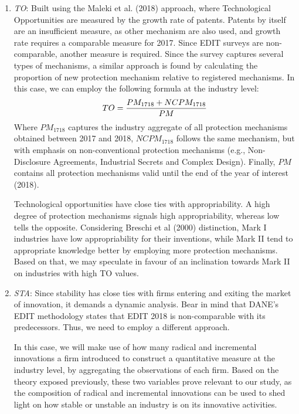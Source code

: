 \documentclass[12pt,a4paper]{article}
\begin{document}
\begin{enumerate}
	\item \textit{TO}: Built using the Maleki et al. (2018) approach, where Technological Opportunities are measured by the growth rate of patents. Patents by itself are an insufficient measure, as other mechanism are also used, and growth rate requires a comparable measure for 2017. Since EDIT surveys are non-comparable, another measure is required. Since the survey captures several types of mechanisms, a similar approach is found by calculating the proportion of new protection mechanism relative to registered mechanisms. In this case, we can employ the following formula at the industry level:
	\begin{equation}
		\centering
		TO = \dfrac{PM_{1718} + NCPM_{1718}}{PM}
	\end{equation}
	Where $PM_{1718}$ captures the industry aggregate of all protection mechanisms obtained between 2017 and 2018, $NCPM_{1718}$ follows the same mechanism, but with emphasis on non-conventional protection mechanisms (e.g., Non-Disclosure Agreements, Industrial Secrets and Complex Design). Finally, $PM$ contains all protection mechanisms valid until the end of the year of interest (2018). 
	
	Technological opportunities have close ties with appropriability. A high degree of protection mechanisms signals high appropriability, whereas low tells the opposite. Considering Breschi et al (2000) distinction, Mark I industries have low appropriability for their inventions, while Mark II tend to appropriate knowledge better by employing more protection mechanisms. Based on that, we may speculate in favour of an inclination towards Mark II on industries with high TO values. 
	
	\item \textit{STA}: Since stability has close ties with firms entering and exiting the market of innovation, it demands a dynamic analysis. Bear in mind that DANE’s EDIT methodology states that EDIT 2018 is non-comparable with its predecessors. Thus, we need to employ a different approach.  
	
	In this case, we will make use of how many radical and incremental innovations a firm introduced to construct a quantitative measure at the industry level, by aggregating the observations of each firm. Based on the theory exposed previously, these two variables prove relevant to our study, as the composition of radical and incremental innovations can be used to shed light on how stable or unstable an industry is on its innovative activities. 
	

\end{enumerate}
\end{document}
